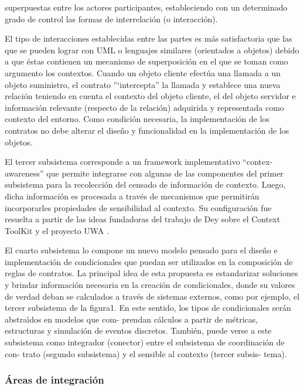 {





superpuestas entre los actores participantes, estableciendo con un
determinado grado de control las formas de interrelación (o interacción).

El tipo de interacciones establecidas entre las partes es más
satisfactoria que las que se pueden lograr con UML o lenguajes
similares (orientados a objetos) debido a que éstas contienen un
mecanismo de superposición en el que se toman como argumento los
contextos. Cuando un objeto cliente efectúa una llamada a un objeto suministro, 
el contrato ”`intercepta”  la llamada y establece una
nueva relación teniendo en cuenta el contexto del objeto cliente, el
del objeto servidor e información relevante (respecto de la relación)
adquirida y representada como contexto del entorno. Como condición
necesaria, la implementación de los contratos no debe alterar el
diseño y funcionalidad en la implementación de los objetos.


El tercer subsistema corresponde a un framework implementativo “contex-awareness” que permite integrarse con algunas de las
componentes del primer subsistema para la recolección del censado de información de contexto. Luego, dicha información es
procesada a través de mecanismos que permitirán incorporarles
propiedades de sensibilidad al contexto. Su configuración fue resuelta a partir de las ideas fundadoras del trabajo de Dey sobre el
Context ToolKit \cite{arqDHD15} y el proyecto UWA \cite{arqDHD16}.

El cuarto subsistema lo compone un nuevo modelo pensado
para el diseño e implementación de condicionales que puedan ser
utilizados en la composición de reglas de contratos. La principal
idea de esta propuesta es estandarizar soluciones y brindar información necesaria en la creación de condicionales, donde su valores
de verdad deban se calculados a través de sistemas externos, como por
ejemplo, el tercer subsistema de la figura1. En este sentido,
los tipos de condicionales serán abstraı́dos en modelos que com-
prendan cálculos a partir de métricas, estructuras y simulación de
eventos discretos. También, puede verse a este subsistema como
integrador (conector) entre el subsistema de coordinación de con-
trato (segundo subsistema) y el sensible al contexto (tercer subsis-
tema).



\subsubsection{Áreas de integración}


}
